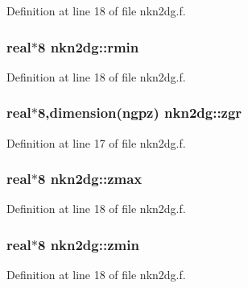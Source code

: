 Definition at line 18 of file nkn2dg.f.\hypertarget{namespacenkn2dg_ff6da305fb08058f838a59caa1a250ee}{
\subsubsection[rmin]{\setlength{\rightskip}{0pt plus 5cm}real$\ast$8 {\bf nkn2dg::rmin}}}
\label{namespacenkn2dg_ff6da305fb08058f838a59caa1a250ee}




Definition at line 18 of file nkn2dg.f.\hypertarget{namespacenkn2dg_0c40a3d27386ecf84f131294ff888421}{
\subsubsection[zgr]{\setlength{\rightskip}{0pt plus 5cm}real$\ast$8,dimension(ngpz) {\bf nkn2dg::zgr}}}
\label{namespacenkn2dg_0c40a3d27386ecf84f131294ff888421}




Definition at line 17 of file nkn2dg.f.\hypertarget{namespacenkn2dg_94fb3ed033f384d20c9e79216d6c94c4}{
\subsubsection[zmax]{\setlength{\rightskip}{0pt plus 5cm}real$\ast$8 {\bf nkn2dg::zmax}}}
\label{namespacenkn2dg_94fb3ed033f384d20c9e79216d6c94c4}




Definition at line 18 of file nkn2dg.f.\hypertarget{namespacenkn2dg_149c8541a12c707978582512a081c137}{
\subsubsection[zmin]{\setlength{\rightskip}{0pt plus 5cm}real$\ast$8 {\bf nkn2dg::zmin}}}
\label{namespacenkn2dg_149c8541a12c707978582512a081c137}




Definition at line 18 of file nkn2dg.f.